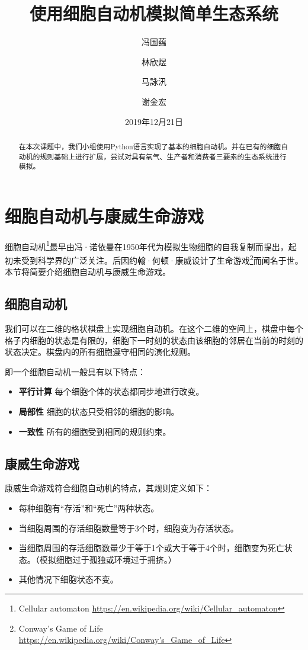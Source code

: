 \documentclass{ctexart}
\author{
	冯国蕴 \and 林欣煜 \and 马詠汛 \and 谢金宏
}
\title{使用细胞自动机模拟简单生态系统}
\date{2019年12月21日}
\begin{document}
\maketitle

\begin{abstract}
在本次课题中，我们小组使用Python语言实现了基本的细胞自动机。并在已有的细胞自动机的规则基础上进行扩展，尝试对具有氧气、生产者和消费者三要素的生态系统进行模拟。
\end{abstract}

\tableofcontents

\section{细胞自动机与康威生命游戏}

细胞自动机\footnote{Cellular automaton \url{https://en.wikipedia.org/wiki/Cellular_automaton}}最早由冯·诺依曼在1950年代为模拟生物细胞的自我复制而提出，起初未受到科学界的广泛关注。后因约翰·何顿·康威设计了生命游戏\footnote{Conway's Game of Life \url{https://en.wikipedia.org/wiki/Conway's_Game_of_Life}}而闻名于世。本节将简要介绍细胞自动机与康威生命游戏。

\subsection{细胞自动机}

我们可以在二维的格状棋盘上实现细胞自动机。在这个二维的空间上，棋盘中每个格子内细胞的状态是有限的，细胞下一时刻的状态由该细胞的邻居在当前的时刻的状态决定。棋盘内的所有细胞遵守相同的演化规则。

即一个细胞自动机一般具有以下特点：

\begin{itemize}
  \item \textbf{平行计算 }每个细胞个体的状态都同步地进行改变。
  \item \textbf{局部性 }细胞的状态只受相邻的细胞的影响。
  \item \textbf{一致性 }所有的细胞受到相同的规则约束。
\end{itemize}

\subsection{康威生命游戏}

康威生命游戏符合细胞自动机的特点，其规则定义如下：

\begin{itemize}
  \item 每种细胞有“存活”和“死亡”两种状态。
  \item 当细胞周围的存活细胞数量等于3个时，细胞变为存活状态。
  \item 当细胞周围的存活细胞数量少于等于1个或大于等于4个时，细胞变为死亡状态。（模拟细胞过于孤独或环境过于拥挤。）
  \item 其他情况下细胞状态不变。
\end{itemize}
\end{document}
